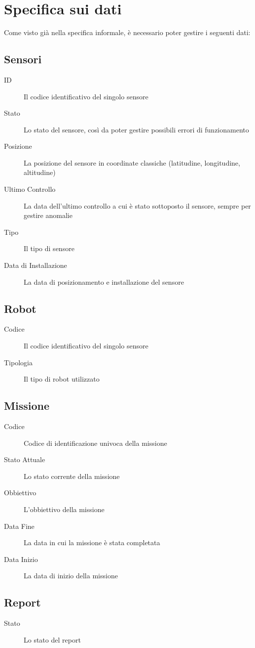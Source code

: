 \section{Specifica sui dati}
Come visto già nella specifica informale, è necessario poter gestire i seguenti dati:
\subsection{Sensori}
\begin{description}
\item[ID] Il codice identificativo del singolo sensore
\item[Stato] Lo stato del sensore, così da poter gestire possibili
  errori di funzionamento
\item[Posizione] La posizione del sensore in coordinate classiche
  (latitudine, longitudine, altitudine)
\item[Ultimo Controllo] La data dell'ultimo controllo a cui è stato
  sottoposto il sensore, sempre per gestire anomalie
\item[Tipo] Il tipo di sensore
\item[Data di Installazione] La data di posizionamento e installazione
  del sensore
\end{description}
\subsection{Robot}
\begin{description}
\item[Codice] Il codice identificativo del singolo sensore
\item[Tipologia] Il tipo di robot utilizzato
\end{description}
\subsection{Missione}
\begin{description}
\item[Codice] Codice di identificazione univoca della missione
\item[Stato Attuale] Lo stato corrente della missione
\item[Obbiettivo] L'obbiettivo della missione
\item[Data Fine] La data in cui la missione è stata completata
\item[Data Inizio] La data di inizio della missione
\end{description}
\subsection{Report}
\begin{description}
\item[Stato] Lo stato del report
\end{description}
